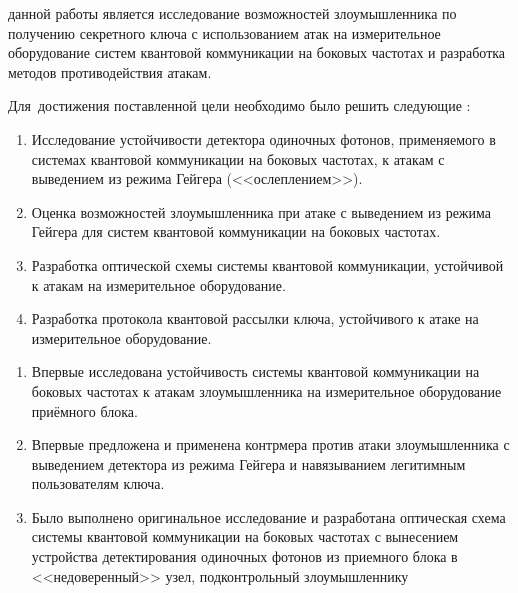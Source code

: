 
{\aim} данной работы является исследование возможностей злоумышленника по получению секретного ключа с использованием атак на измерительное оборудование систем квантовой коммуникации на боковых частотах и разработка методов противодействия атакам.


Для~достижения поставленной цели необходимо было решить следующие {\tasks}:
\begin{enumerate}
  \item Исследование устойчивости детектора одиночных фотонов, применяемого в системах квантовой коммуникации на боковых частотах, к атакам с выведением из режима Гейгера (<<ослеплением>>). 

  \item Оценка возможностей злоумышленника при атаке с выведением из режима Гейгера для систем квантовой коммуникации на боковых частотах. 

  \item Разработка оптической схемы системы квантовой коммуникации, устойчивой к атакам на измерительное оборудование. 

  \item Разработка протокола квантовой рассылки ключа, устойчивого к атаке на измерительное оборудование. 

\end{enumerate}


{\novelty}
\begin{enumerate}
  \item Впервые исследована устойчивость системы квантовой коммуникации на боковых частотах к атакам злоумышленника на измерительное оборудование приёмного блока. 
  \item Впервые предложена и применена контрмера против атаки злоумышленника с выведением детектора из режима Гейгера и навязыванием легитимным пользователям ключа. 
  \item Было выполнено оригинальное исследование и разработана оптическая схема системы квантовой коммуникации на боковых частотах с вынесением устройства детектирования одиночных фотонов из приемного блока в <<недоверенный>> узел, подконтрольный злоумышленнику 
\end{enumerate}

{\influence} 

